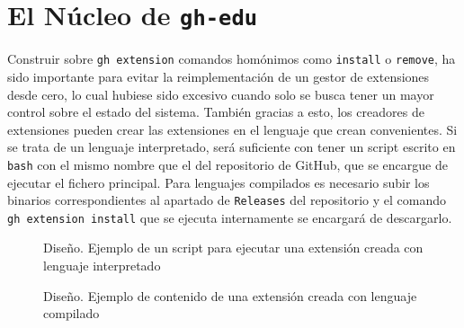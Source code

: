 \section{El Núcleo de {\tt gh-edu}}
Construir sobre \verb|gh extension| comandos homónimos como \verb|install| o \verb|remove|, ha sido importante para evitar la reimplementación de un gestor de extensiones desde cero, lo cual hubiese sido excesivo cuando solo se busca tener un mayor control sobre el estado del sistema. También gracias a esto, los creadores de extensiones pueden crear las extensiones en el lenguaje que crean convenientes. Si se trata de un lenguaje interpretado, será suficiente con tener un script escrito en \verb|bash| con el mismo nombre que el del repositorio de GitHub, que se encargue de ejecutar el fichero principal. Para lenguajes compilados es necesario subir los binarios correspondientes al apartado de \verb|Releases| del repositorio y el comando \verb|gh extension install| que se ejecuta internamente se encargará de descargarlo.

\begin{figure}[H]
    \centering
    \caption{Diseño. Ejemplo de un script para ejecutar una extensión creada con lenguaje interpretado}
    \label{fig:bash}
\end{figure}

\begin{figure}[H]
    \centering
    \caption{Diseño. Ejemplo de contenido de una extensión creada con lenguaje compilado}
    \label{fig:binario}
\end{figure}


